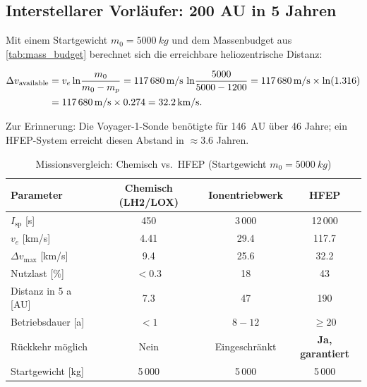 ﻿\documentclass[a4paper,12pt,twoside]{article}
\theoremstyle{plain}
\theoremstyle{definition}
\theoremstyle{remark}
\newcommand{\Isp}{I_{\mathrm{sp}}}
\newcommand{\ve}{v_e}
\newcommand{\Dv}{\Delta v}
\begin{document}
	\subsection{Interstellarer Vorläufer: 200 AU in 5 Jahren}
	
	Mit einem Startgewicht $m_0 = \SI{5000}{kg}$ und dem Massenbudget aus
	\cref{tab:mass_budget} berechnet sich die erreichbare heliozentrische Distanz:
	
	\begin{align}
		\Dv_{\rm available} &= \ve\ln\!\frac{m_0}{m_0 - m_p}
		= \SI{117680}{m/s}\,\ln\!\frac{5000}{5000-1200}
		= \SI{117680}{m/s}\times\ln(1.316) \nonumber\\
		&= \SI{117680}{m/s}\times 0.274 = \SI{32.2}{km/s}.
	\end{align}
	
	Zur Erinnerung: Die Voyager-1-Sonde \cite{kohlhase1977, stone2013} benötigte für \SI{146}{AU} über 46 Jahre;
	ein HFEP-System erreicht diesen Abstand in $\approx 3.6$ Jahren.
	
	\begin{table}[H]
		\centering
		\caption{Missionsvergleich: Chemisch vs.\ HFEP (Startgewicht $m_0 = \SI{5000}{kg}$)}
		\label{tab:mission_compare}
		\renewcommand{\arraystretch}{1.35}
		\begin{tabular}{lccc}
			\toprule
			\textbf{Parameter} & \textbf{Chemisch (LH2/LOX)} & \textbf{Ionentriebwerk} & \textbf{HFEP}\\
			\midrule
			$\Isp$ [s]           & 450          & 3\,000        & 12\,000\\
			$\ve$ [km/s]         & 4.41         & 29.4          & 117.7\\
			$\Dv_{\max}$ [km/s]  & 9.4          & 25.6          & 32.2\\
			Nutzlast [\%]        & $<0.3$        & 18            & 43\\
			Distanz in 5 a [AU]  & 7.3          & 47            & 190\\
			Betriebsdauer [a]    & $<1$         & $8-12$        & $\geq 20$\\
			Rückkehr möglich     & Nein         & Eingeschränkt & \textbf{Ja, garantiert}\\
			Startgewicht [kg]    & 5\,000       & 5\,000        & 5\,000\\
			\bottomrule
		\end{tabular}
	\end{table}
	
\end{document}
